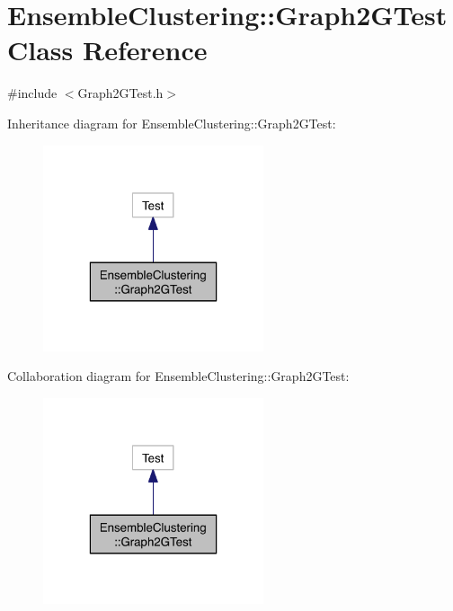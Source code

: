 \hypertarget{class_ensemble_clustering_1_1_graph2_g_test}{\section{Ensemble\-Clustering\-:\-:Graph2\-G\-Test Class Reference}
\label{class_ensemble_clustering_1_1_graph2_g_test}
}


{\ttfamily \#include $<$Graph2\-G\-Test.\-h$>$}



Inheritance diagram for Ensemble\-Clustering\-:\-:Graph2\-G\-Test\-:
\nopagebreak
\begin{figure}[H]
\begin{center}
\leavevmode
\includegraphics[width=184pt]{class_ensemble_clustering_1_1_graph2_g_test__inherit__graph}
\end{center}
\end{figure}


Collaboration diagram for Ensemble\-Clustering\-:\-:Graph2\-G\-Test\-:
\nopagebreak
\begin{figure}[H]
\begin{center}
\leavevmode
\includegraphics[width=184pt]{class_ensemble_clustering_1_1_graph2_g_test__coll__graph}
\end{center}
\end{figure}
